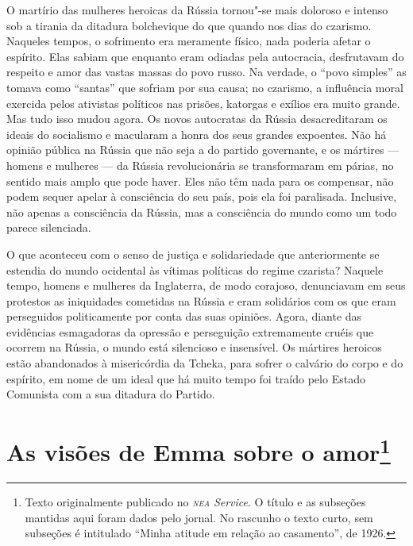 O martírio das mulheres heroicas da Rússia tornou"-se mais doloroso e
intenso sob a tirania da ditadura bolchevique do que quando nos dias do
czarismo. Naqueles tempos, o sofrimento era meramente físico, nada
poderia afetar o espírito. Elas sabiam que enquanto eram odiadas pela
autocracia, desfrutavam do respeito e amor das vastas massas do povo
russo. Na verdade, o ``povo simples'' as tomava como ``santas'' que
sofriam por sua causa; no czarismo, a influência moral exercida pelos
ativistas políticos nas prisões, katorgas e exílios era muito grande.
Mas tudo isso mudou agora. Os novos autocratas da Rússia desacreditaram
os ideais do socialismo e macularam a honra dos seus grandes expoentes.
Não há opinião pública na Rússia que não seja a do partido governante, e\label{ref2}
os mártires --- homens e mulheres --- da Rússia revolucionária se
transformaram em párias, no sentido mais amplo que pode haver. Eles não
têm nada para os compensar, não podem sequer apelar à consciência do seu
país, pois ela foi paralisada. Inclusive, não apenas a consciência da
Rússia, mas a consciência do mundo como um todo parece silenciada.

O que aconteceu com o senso de justiça e solidariedade que
anteriormente se estendia do mundo ocidental às vítimas políticas do
regime czarista? Naquele tempo, homens e mulheres da Inglaterra, de modo
corajoso, denunciavam em seus protestos as iniquidades cometidas na
Rússia e eram solidários com os que eram perseguidos politicamente por
conta das suas opiniões. Agora, diante das evidências esmagadoras da
opressão e perseguição extremamente cruéis que ocorrem na Rússia, o
mundo está silencioso e insensível. Os mártires heroicos estão
abandonados à misericórdia da Tcheka, para sofrer o calvário do corpo e
do espírito, em nome de um ideal que há muito tempo foi traído pelo
Estado Comunista com a sua ditadura do Partido.

\chapter{As visões de Emma sobre o amor\footnote{Texto originalmente publicado no
  \emph{\textsc{nea} Service}. O título e as subseções mantidas
  aqui foram dados pelo jornal. No rascunho o texto curto, sem
  subseções é intitulado ``Minha atitude em relação ao casamento'', de 1926.}}


